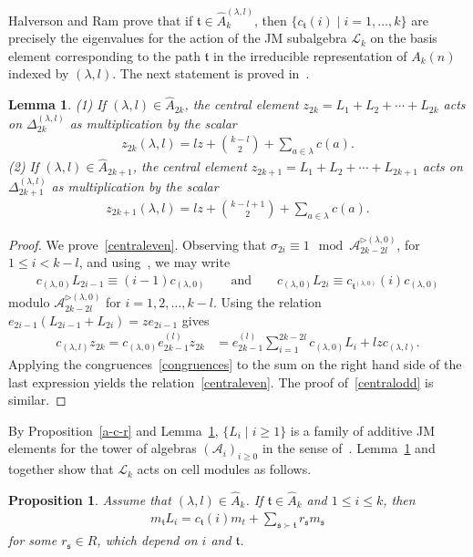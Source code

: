 \documentclass[11pt,a4paper,reqno,svgnames]{amsart}
\theoremstyle{plain}
\newtheorem{proposition}[theorem]{Proposition}
\newtheorem{lemma}[theorem]{Lemma}
\theoremstyle{definition}
\numberwithin{equation}{section}
\begin{document}
Halverson and Ram \cite[Theorem~3.37]{MR2143201} prove that if $\mathfrak{t} \in\hat{A}_{k}^{(\lambda,l)}$, then  $\{c_\mathfrak{t}(i)\mid i=1,\ldots,k\}$ are precisely the eigenvalues for the action of the JM subalgebra $\mathscr{L}_k$ on the basis element corresponding to the path $\mathfrak{t}$ in the irreducible representation of $A_k(n)$ indexed by $(\lambda,l)$. The next statement is proved in~\cite[Theorem~3.35]{MR2143201}. 
\begin{lemma}\label{centralaction} (1) If $(\lambda,l)\in\hat{A}_{2k}$, the central element $z_{2k}=L_1+L_2+\cdots+L_{2k}$ acts on $\Delta_{2k}^{(\lambda,l)}$ as multiplication by the scalar
\begin{align}\label{centraleven}
z_{2k}(\lambda,l)=lz+\binom{k-l}{2}+\sum_{a\in\lambda} c(a).
\end{align}
(2) If $(\lambda,l)\in\hat{A}_{2k+1}$, the central element $z_{2k+1}=L_1+L_2+\cdots+L_{2k+1}$ acts on $\Delta_{2k+1}^{(\lambda,l)}$ as multiplication by the scalar
\begin{align}\label{centralodd}
z_{2k+1}(\lambda,l)=lz+\binom{k-l+1}{2}+\sum_{a\in\lambda} c(a).
\end{align}
\end{lemma}
\begin{proof}
We prove~\eqref{centraleven}. Observing that $\sigma_{2i}\equiv 1\mod \mathcal{A}_{2k-2l}^{\rhd(\lambda,0)}$, for $1{\leqslant} i<k-l$, and using~\cite[Theorem~3.32]{MR1711316}, we may write
\begin{align}\label{congruences}
c_{(\lambda,0)}L_{2i-1}\equiv (i-1)c_{(\lambda,0)} \qquad \text{and}\qquad c_{(\lambda,0)}L_{2i}\equiv c_{\mathfrak{t}^{(\lambda,0)}}(i)c_{(\lambda,0)}
\end{align}
modulo $\mathcal{A}_{2k-2l}^{\rhd (\lambda,0)}$ for $i=1,2,\ldots, k-l$. Using the relation $e_{2i-1}(L_{2i-1}+ L_{2i})=ze_{2i-1}$ gives 
\begin{align*}
c_{(\lambda,l)}z_{2k}=c_{(\lambda,0)}e_{2k-1}^{(l)}z_{2k}& =e_{2k-1}^{(l)}\sum_{i=1}^{2k-2l}c_{(\lambda,0)}  L_{i}+ lz c_{(\lambda,l)}.
\end{align*}
Applying the congruences~\eqref{congruences} to the sum on the right hand side of the last expression yields the relation~\eqref{centraleven}. The proof of~\eqref{centralodd} is similar. 
\end{proof}

By Proposition~\ref{a-c-r} and Lemma~\ref{centralaction}, $\lbrace L_i\mid i{\geqslant} 1\rbrace$ is a family of additive JM elements for the tower of algebras $(\mathcal{A}_i)_{i{\geqslant}0}$ in the sense of~\cite[Definition~3.4]{MR2774622}. Lemma~\ref{centralaction} and~\cite[Proposition~3.7]{MR2774622} together show that $\mathscr{L}_k$ acts on cell modules as follows.
\begin{proposition}\label{u-t-c}
Assume that $(\lambda,l)\in\hat{A}_k$. If $\mathfrak{t}\in\hat{A}_k$ and $1{\leqslant} i{\leqslant} k$, then 
\begin{align*}
m_\mathfrak{t}L_i=c_\mathfrak{t}(i)m_t +\sum_{\mathfrak{s}\succ \mathfrak{t}}r_\mathfrak{s}m_\mathfrak{s}
\end{align*}
for some $r_\mathfrak{s}\in R$, which depend on $i$ and $\mathfrak{t}$. 
\end{proposition}
\end{document}
